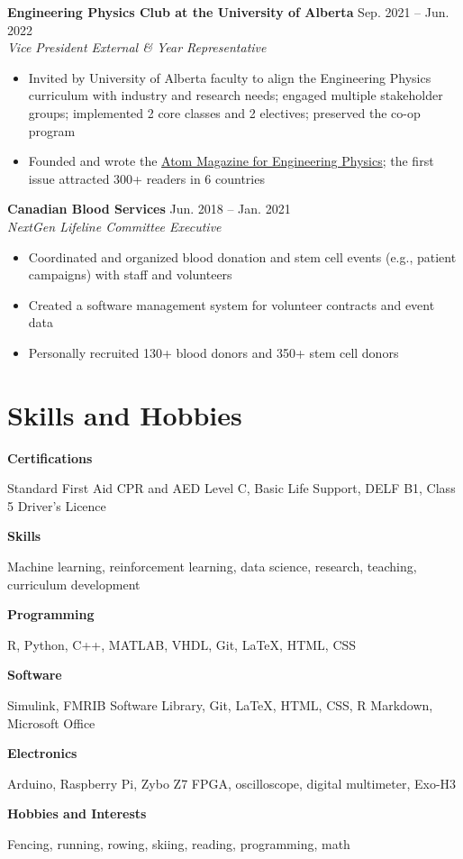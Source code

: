 \documentclass{article}
\begin{document}
\textbf{Engineering Physics Club at the University of Alberta} \hfill Sep. 2021 -- Jun. 2022 \\
\textit{Vice President External \& Year Representative}
\begin{itemize}
    \item Invited by University of Alberta faculty to align the Engineering Physics curriculum with industry and research needs; engaged multiple stakeholder groups; implemented 2 core classes and 2 electives; preserved the co-op program
    \item Founded and wrote the \href{https://atom-winter-2022.netlify.app/}{Atom Magazine for Engineering Physics}; the first issue attracted 300+ readers in 6 countries
\end{itemize} \vspace{1em}

\textbf{Canadian Blood Services} \hfill Jun. 2018 -- Jan. 2021 \\
\textit{NextGen Lifeline Committee Executive}
\begin{itemize}
    \item Coordinated and organized blood donation and stem cell events (e.g., patient campaigns) with staff and volunteers
    \item Created a software management system for volunteer contracts and event data
    \item Personally recruited 130+ blood donors and 350+ stem cell donors
\end{itemize}


\section*{\textcolor{my_colour}{Skills and Hobbies}}
\vspace{-.25em} \hrulefill \vspace{.25em}

\textbf{Certifications} \hfill \parbox[t]{.8\linewidth}{Standard First Aid CPR and AED Level C, Basic Life Support, DELF B1, Class 5 Driver's Licence}

\textbf{Skills} \hfill \parbox[t]{.8\linewidth}{Machine learning, reinforcement learning, data science, research, teaching, curriculum development}

\textbf{Programming} \hfill \parbox[t]{.8\linewidth}{R, Python, C++, MATLAB, VHDL, Git, \LaTeX, HTML, CSS}

\textbf{Software} \hfill \parbox[t]{0.8\linewidth}{Simulink, FMRIB Software Library, Git, \LaTeX, HTML, CSS, R Markdown, Microsoft Office}

\textbf{Electronics} \hfill \parbox[t]{0.8\linewidth}{Arduino, Raspberry Pi, Zybo Z7 FPGA, oscilloscope, digital multimeter, Exo-H3}

\textbf{Hobbies and Interests} \hfill \parbox[t]{.8\linewidth}{Fencing, running, rowing, skiing, reading, programming, math}
\end{document}
